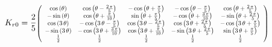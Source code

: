 \begin{equation}
\label{mat:Kr}
 K_{r0}=\frac{2}{5}\resizebox{0.8\textwidth}{!}{$
    \left( \begin{array}{ccccc}
    \cos \left(\theta \right) & \cos \left(\theta -\frac{2\,\pi }{5}\right) & -\cos \left(\theta +\frac{\pi }{5}\right) & -\cos \left(\theta -\frac{\pi }{5}\right) & \cos \left(\theta +\frac{2\,\pi }{5}\right)\\
    -\sin \left(\theta \right) & \cos \left(\theta +\frac{\pi }{10}\right) & \sin \left(\theta +\frac{\pi }{5}\right) & -\cos \left(\theta +\frac{3\,\pi }{10}\right) & -\sin \left(\theta +\frac{2\,\pi }{5}\right)\\
    \cos \left(3\,\theta \right) & -\cos \left(3\,\theta -\frac{\pi }{5}\right) & \cos \left(3\,\theta -\frac{2\,\pi }{5}\right) & \cos \left(3\,\theta +\frac{2\,\pi }{5}\right) & -\cos \left(3\,\theta +\frac{\pi }{5}\right)\\
    -\sin \left(3\,\theta \right) & -\cos \left(3\,\theta +\frac{3\,\pi }{10}\right) & \cos \left(3\,\theta +\frac{\pi }{10}\right) & -\sin \left(3\,\theta +\frac{2\,\pi }{5}\right) & \sin \left(3\,\theta +\frac{\pi }{5}\right)\\
    \frac{1}{2} & \frac{1}{2} & \frac{1}{2} & \frac{1}{2} & \frac{1}{2}
\end{array} \right)
$}
\end{equation}
